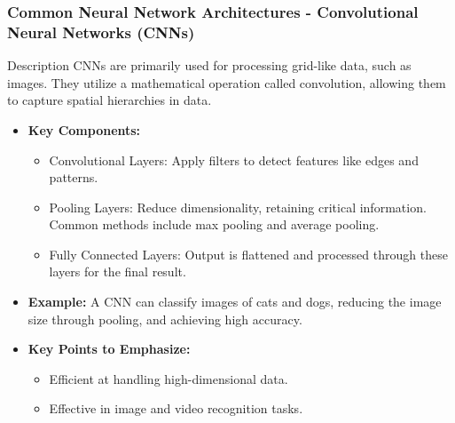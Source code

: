 \documentclass[aspectratio=169]{beamer}
\begin{document}
\begin{frame}[fragile]
    \frametitle{Common Neural Network Architectures - Convolutional Neural Networks (CNNs)}
    \begin{block}{Description}
        CNNs are primarily used for processing grid-like data, such as images. They utilize a mathematical operation called convolution, allowing them to capture spatial hierarchies in data.
    \end{block}

    \begin{itemize}
        \item \textbf{Key Components:}
            \begin{itemize}
                \item Convolutional Layers: Apply filters to detect features like edges and patterns.
                \item Pooling Layers: Reduce dimensionality, retaining critical information. Common methods include max pooling and average pooling.
                \item Fully Connected Layers: Output is flattened and processed through these layers for the final result.
            \end{itemize}
        \item \textbf{Example:} A CNN can classify images of cats and dogs, reducing the image size through pooling, and achieving high accuracy.
        \item \textbf{Key Points to Emphasize:}
            \begin{itemize}
                \item Efficient at handling high-dimensional data.
                \item Effective in image and video recognition tasks.
            \end{itemize}
    \end{itemize}
\end{frame}
\end{document}
